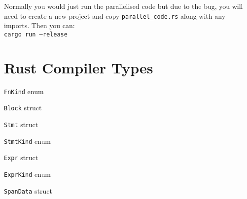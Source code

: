 Normally you would just run the parallelised code but due to the bug, you will need to create a new project and copy \texttt{parallel\_code.rs} along with any imports. Then you can: \\
\texttt{cargo run --release}

%
%

\section{Rust Compiler Types}
\begin{code}
    \caption{\texttt{FnKind} enum}
    \label{lst:rustc-FnKind}
\end{code}

\begin{code}
    \caption{\texttt{Block} struct}
    \label{lst:rustc-Block}
\end{code}

\begin{code}
    \caption{\texttt{Stmt} struct}
    \label{lst:rustc-Stmt}
\end{code}

\begin{code}
    \caption{\texttt{StmtKind} enum}
    \label{lst:rustc-StmtKind}
\end{code}

\begin{code}
    \caption{\texttt{Expr} struct}
    \label{lst:rustc-Expr}
\end{code}

\begin{code}
    \caption{\texttt{ExprKind} enum}
    \label{lst:rustc-ExprKind}
\end{code}

\begin{code}
    \caption{\texttt{SpanData} struct}
    \label{lst:rustc-SpanData}
\end{code}
